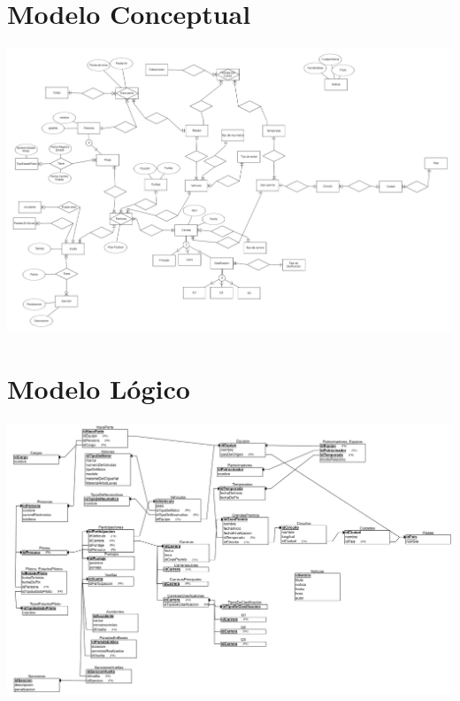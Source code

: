 \documentclass{article}
\begin{document}
	\section{Modelo Conceptual}
	
	\includegraphics[width=\textwidth]{modelo_conceptual}
	
	\section{Modelo Lógico}
	
	\includegraphics[width=\textwidth]{Modelo_Logico}
	
\end{document}
